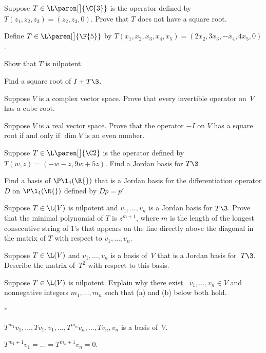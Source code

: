 
\exercise
Suppose $T \in \L\paren[\big]{\C{3}}$ is the operator defined by $T(z_1, z_2, z_3) = (z_2, z_3, 0)$.  Prove
that $T$ does not have a square root.\label{195}


\exercise
Define $T \in \L\paren[\big]{\F{5}}$ by
$T(x_1, x_2, x_3, x_4, x_5) = (2 x_2, 3 x_3, -x_4, 4 x_5, 0)$.
\begin{subtheorem}
\item
Show that $T$ is nilpotent.
\item
Find a square root of $I + T\3$.
\end{subtheorem}
\exercisesubtheoremend


\exercise
Suppose $V$ is a complex vector space. Prove that every invertible operator
on~$V$ has a cube root.


\exercise
Suppose $V$ is a real vector space. Prove that the operator $-I$ on $V$ has a square root if and only if $\dim V$ is an even number.


\exercise
Suppose $T \in \L\paren[\big]{\C2}$ is the operator defined by $T(w, z) = (-w - z, 9w + 5z)$. Find a Jordan basis for $T\3$.


\exercise
Find a basis of $\P\1_4(\R{})$ that is a Jordan basis for the differentiation operator $D$ on $\P\1_4(\R{})$ defined by $Dp = p'\!$.


\exercise
Suppose $T \in \L(V)$ is nilpotent and $v_1, \ldots, v_n$ is a Jordan basis for $T\3$.  Prove that the minimal polynomial of $T$ is
$z^{m+1}$, where $m$ is the length of the longest consecutive string of $1$'s that
appears on the line directly above the diagonal in the matrix of $T$ with respect to
$v_1, \ldots, v_n$. \label{nilmin}


\exercise
Suppose $T \in \L(V)$ and $v_1, \dots, v_n$ is a basis of~$V$ that is a Jordan
basis for~$T\3$. Describe the matrix of~$T^2$ with respect to this basis.


\exercise
Suppose $T \in \L(V)$ is nilpotent. Explain why there exist \ $v_1, \dots, v_n \in V$ and nonnegative integers $m_1, \dots, m_n$ such that (a) and (b) below both hold.
\begin{subtheorem}*
\item
$T^{m_1}v_1, \dots, Tv_1, v_1, \dots, T^{m_n}v_n, \dots, Tv_n, v_n$ is a basis of~$V$.
\item
$T^{m_1 + 1} v_1 = \dots = T^{m_n + 1} v_n = 0$.
\end{subtheorem}
\exercisesubtheoremend


